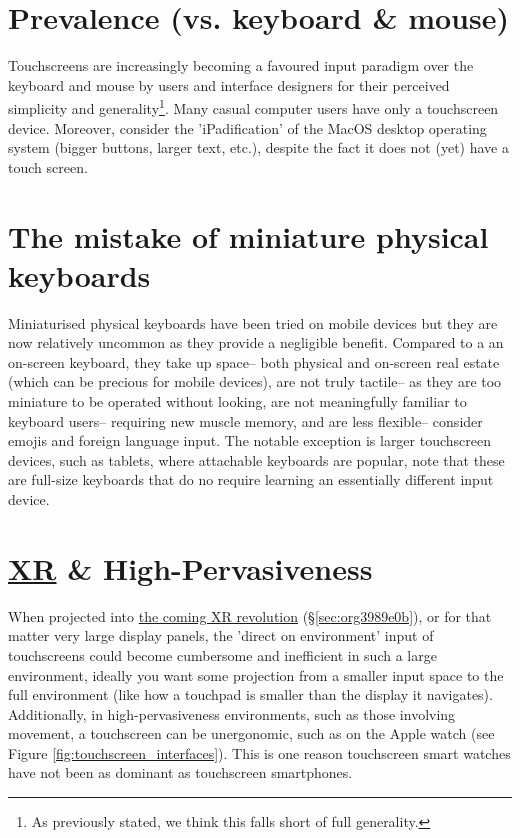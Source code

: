 \documentclass[logo,bsc,singlespacing,parskip]{infthesis}
\begin{document}
\section{Prevalence (vs. keyboard \& mouse)}
\label{sec:org9a7ed4a}
Touchscreens are increasingly becoming a favoured input paradigm over the keyboard and mouse by users and interface designers for their perceived simplicity and generality\footnote{As previously stated, we think this falls short of full generality.}.
Many casual computer users have only a touchscreen device.
Moreover, consider the 'iPadification' of the MacOS desktop operating system (bigger buttons, larger text, etc.), despite the fact it does not (yet) have a touch screen.

\section{The mistake of miniature physical keyboards}
\label{sec:orgd67d4fc}
Miniaturised physical keyboards have been tried on mobile devices but they are now relatively uncommon as they provide a negligible benefit.
Compared to a an on-screen keyboard, they take up space-- both physical and on-screen real estate (which can be precious for mobile devices), are not truly tactile-- as they are too miniature to be operated without looking, are not meaningfully familiar to keyboard users-- requiring new muscle memory, and are less flexible-- consider emojis and foreign language input.
The notable exception is larger touchscreen devices, such as tablets, where attachable keyboards are popular, note that these are full-size keyboards that do no require learning an essentially different input device.

\section{\hyperref[orgf7f8e78]{XR} \& High-Pervasiveness}
\label{sec:org138500e}
When projected into \hyperref[sec:org3989e0b]{the coming XR revolution} (\S \ref{sec:org3989e0b}), or for that matter very large display panels, the 'direct on environment' input of touchscreens could become cumbersome and inefficient in such a large environment, ideally you want some projection from a smaller input space to the full environment (like how a touchpad is smaller than the display it navigates).
Additionally, in high-pervasiveness environments, such as those involving movement, a touchscreen can be unergonomic, such as on the Apple watch (see Figure \ref{fig:touchscreen_interfaces}).
This is one reason touchscreen smart watches have not been as dominant as touchscreen smartphones.
\end{document}
